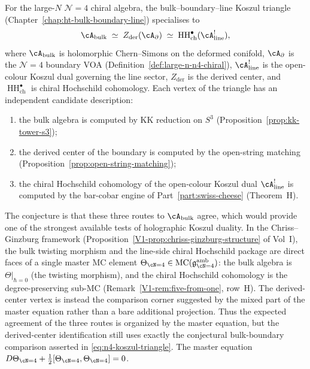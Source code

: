\begin{conjecture}[The Koszul triangle for $\mathcal{N}=4$;
\ClaimStatusConjectured]
For the large-$N$ $\mathcal{N}=4$ chiral algebra, the
bulk--boundary--line Koszul triangle
(Chapter~\ref{chap:ht-bulk-boundary-line}) specialises to
\begin{equation}%
 \cA_{\mathrm{bulk}}
 \;\simeq\;
 Z_{\mathrm{der}}(\cA_{\partial})
 \;\simeq\;
 \operatorname{HH}^\bullet_{\mathrm{ch}}(\cA^!_{\mathrm{line}}),
\end{equation}
where $\cA_{\mathrm{bulk}}$ is holomorphic Chern--Simons on the
deformed conifold, $\cA_\partial$ is the $\mathcal{N}=4$ boundary VOA
(Definition~\ref{def:large-n-n4-chiral}), $\cA^!_{\mathrm{line}}$ is
the open-colour Koszul dual governing the line sector,
$Z_{\mathrm{der}}$ is the derived center, and
$\operatorname{HH}^\bullet_{\mathrm{ch}}$ is chiral Hochschild
cohomology. Each vertex of the triangle has an independent
candidate description:
\begin{enumerate}[label=\textup{(\roman*)},nosep]
\item the bulk algebra is computed by KK reduction on $S^3$
 (Proposition~\ref{prop:kk-tower-s3});
\item the derived center of the boundary is computed by the open-string
 matching (Proposition~\ref{prop:open-string-matching});
\item the chiral Hochschild cohomology of the open-colour Koszul dual
 $\cA^!_{\mathrm{line}}$ is computed by the bar-cobar engine of
 Part~\ref{part:swiss-cheese} (Theorem~H).
\end{enumerate}
The conjecture is that these three routes to $\cA_{\mathrm{bulk}}$
agree, which would provide one of the strongest available tests of
holographic Koszul duality. In the Chriss--Ginzburg framework
(Proposition~\ref*{V1-prop:chriss-ginzburg-structure} of Vol~I),
the bulk twisting morphism and the line-side chiral Hochschild
package are direct faces of a single master MC element
$\Theta_{\cN=4} \in
\operatorname{MC}(\mathfrak{g}^{\mathrm{amb}}_{\cN=4})$:
the bulk algebra is $\Theta\big|_{\hbar=0}$ (the twisting
morphism), and the chiral Hochschild cohomology is the
degree-preserving sub-MC
(Remark~\ref*{V1-rem:five-from-one}, row~H). The derived-center
vertex is instead the comparison corner suggested by the mixed part
of the master equation rather than a bare additional projection.
Thus the expected agreement of the three routes is organized by the master
equation, but the derived-center identification still uses exactly
the conjectural bulk-boundary comparison asserted in
\eqref{eq:n4-koszul-triangle}. The master equation
$D\Theta_{\cN=4} + \tfrac{1}{2}[\Theta_{\cN=4},\Theta_{\cN=4}] = 0$.
\end{conjecture}

